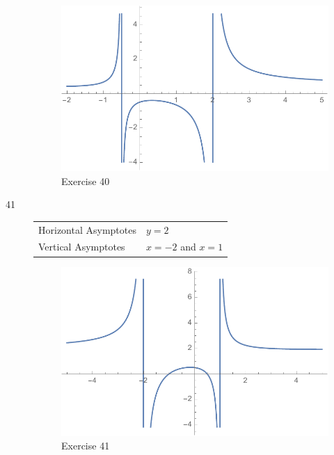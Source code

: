 \documentclass[letterpaper]{exam}
\begin{document}
\begin{description}
        \begin{figure}[H]
          \centering
          \includegraphics[scale = 0.5]{ex40.pdf}
          \caption{Exercise 40}
          \label{fig:ex40}
        \end{figure}

      \item[41]
        \begin{tabular}[H]{ll}
          \toprule
          Horizontal Asymptotes & $y = 2$ \\
          Vertical Asymptotes   & $x = -2$ and $x = 1$ \\
          \bottomrule
        \end{tabular}

        \begin{figure}[H]
          \centering
          \includegraphics[scale = 0.5]{ex41.pdf}
          \caption{Exercise 41}
          \label{fig:ex41}
        \end{figure}


\end{description}
\end{document}
